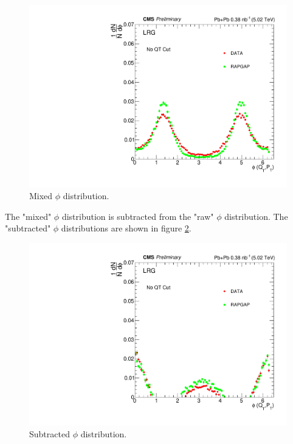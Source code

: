 \begin{figure}[h!]
\begin{centering}
\includegraphics[width=6in]{Chapter6/importfigs/phi_allQt_mixed.pdf}
\par\end{centering}
\caption{Mixed $\phi$ distribution. \label{fig:mixPhi}}
\end{figure}

The "mixed" $\phi$ distribution is subtracted from the "raw" $\phi$ distribution. The "subtracted" $\phi$ distributions are shown in figure \ref{fig:subPhi}.

\begin{figure}[h!]
\begin{centering}
\includegraphics[width=6in]{Chapter6/importfigs/phi_allQt_subbed.pdf}
\par\end{centering}
\caption{Subtracted $\phi$ distribution. \label{fig:subPhi}}
\end{figure}

